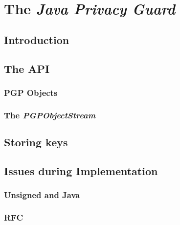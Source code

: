\chapter{The \textit{Java Privacy Guard}}





\section{Introduction}


\section{The API}

\subsection{PGP Objects}

\subsection{The \textit{PGPObjectStream}}


\section{Storing keys}


\section{Issues during Implementation}

\subsection{Unsigned and Java}

\subsection{RFC}

